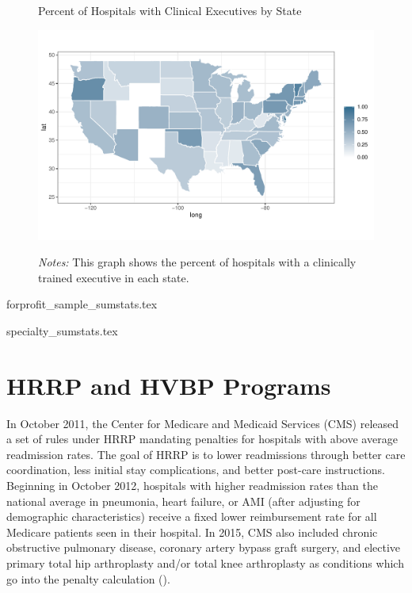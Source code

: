\documentclass[12pt]{article}
\begin{document}
\begin{figure}[p!]
    \centering
    \caption{Percent of Hospitals with Clinical Executives by State}
    \includegraphics[width=\textwidth]{Objects/has_doc_avg_map.pdf}
    \label{fig:state_doc}
    \caption*{\footnotesize{\textit{Notes:} This graph shows the percent of hospitals with a clinically trained executive in each state.}}
\end{figure}

\newpage

{forprofit_sample_sumstats.tex}

\newpage

{specialty_sumstats.tex}

\newpage



\section{HRRP and HVBP Programs}\label{app:programs}

In October 2011, the Center for Medicare and Medicaid Services (CMS) released a set of rules under HRRP mandating penalties for hospitals with above average readmission rates. The goal of HRRP is to lower readmissions through better care coordination, less initial stay complications, and better post-care instructions. Beginning in October 2012, hospitals with higher readmission rates than the national average in pneumonia, heart failure, or AMI (after adjusting for demographic characteristics) receive a fixed lower reimbursement rate for all Medicare patients seen in their hospital. In 2015, CMS also included chronic obstructive pulmonary disease, coronary artery bypass graft surgery, and elective primary total hip arthroplasty and/or total knee arthroplasty as conditions which go into the penalty calculation (\cite{CMS}). 
    
\end{document}
